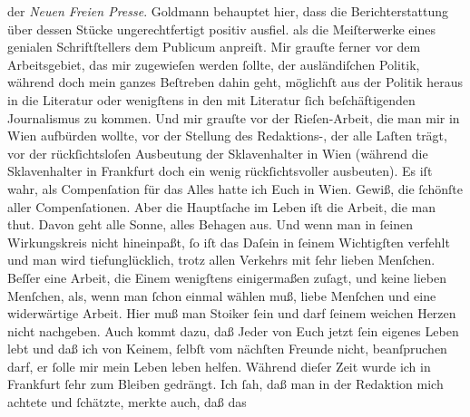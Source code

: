 \begin{ledgroupsized}[t]{13cm}
{{{                  der \emph{Neuen Freien Presse}. Goldmann behauptet hier, dass die Berichterstattung über
                  dessen Stücke ungerechtfertigt positiv ausfiel.}}}\label{K_L02868-3h} als die {\pb}Meiſterwerke eines genialen Schriftſtellers dem
               Publicum anpreiſt.  Mir grauſte ferner vor dem
               Arbeitsgebiet, das mir zugewieſen werden ſollte, der ausländiſchen Politik, während
               doch mein ganzes Beſtreben dahin geht, möglichſt aus der Politik heraus in die
               Literatur oder wenigſtens in den mit Literatur ſich beſchäftigenden Journalismus zu
               kommen. Und mir grauſte vor der Rieſen-Arbeit, die man mir in Wien aufbürden wollte, vor der Stellung des Redaktions-\label{K_L02868-4v}\label{K_L02868-4h}, der alle Laſten trägt, vor der rückſichtsloſen Ausbeutung der
               Sklavenhalter in Wien (während die Sklavenhalter
               in Frankfurt doch ein wenig  rückſichtsvoller ausbeuten). Es iſt wahr, als Compenſation für das Alles hatte
               ich Euch in Wien.  Gewiß, die ſchönſte aller Compenſationen. Aber  die Hauptſache im Leben iſt die Arbeit, die man thut. Davon geht alle
               Sonne, alles Behagen aus. Und wenn man in ſeinen Wirkungskreis nicht hineinpaßt, ſo
               iſt das Daſein in ſeinem Wichtigſten verfehlt und man wird tiefunglücklich, trotz
               allen Verkehrs {\pb}mit ſehr lieben Menſchen. Beſſer
               eine Arbeit, die Einem wenigſtens einigermaßen zuſagt, und keine lieben Menſchen,
               als, wenn man ſchon einmal wählen muß, liebe Menſchen und eine widerwärtige Arbeit.
                  \introOben{}Hier muß man Stoiker ſein und darf ſeinem weichen Herzen nicht
                  nachgeben.\introOben{} Auch kommt dazu, daß Jeder von Euch jetzt ſein eigenes Leben lebt
               und daß ich von \strikeout{\textcolor{gray}{K}} Keinem, ſelbſt vom nächſten Freunde nicht, beanſpruchen darf, er ſolle mir
               mein Leben leben helfen. Während dieſer Zeit wurde ich in Frankfurt ſehr zum Bleiben gedrängt. Ich ſah, daß  man in der Redaktion mich achtete und ſchätzte, merkte auch, daß das

\end{ledgroupsized}
